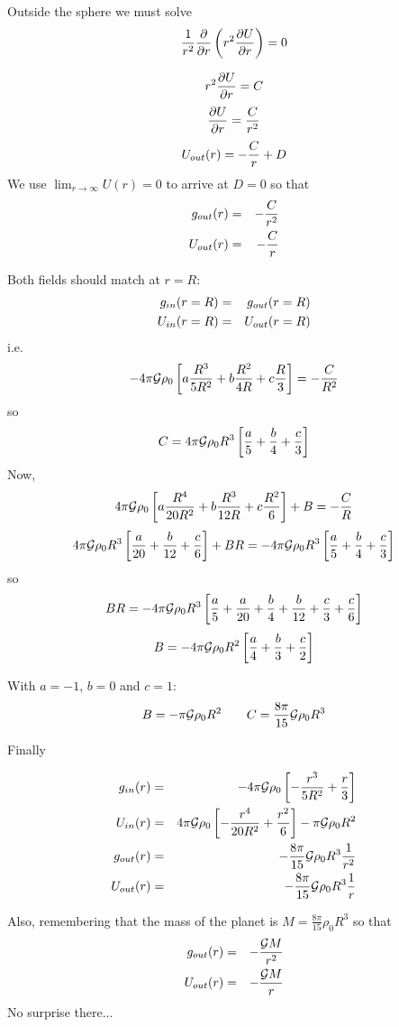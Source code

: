 Outside the sphere we must solve 
\begin{equation}
\frac{1}{r^2} \frac{\partial}{\partial r} \left( r^2 \frac{\partial U}{\partial r} \right) = 0 \nonumber
\end{equation}

\begin{equation}
r^2 \frac{\partial U}{\partial r}  = C \nonumber 
\end{equation}
\begin{equation}
\frac{\partial U}{\partial r}  = \frac{C}{r^2} \nonumber
\end{equation}
\begin{equation}
U_{out}(r) = -\frac{C}{r} + D  \nonumber
\end{equation}
We use $\lim_{r\rightarrow\infty}U(r)=0$ to arrive at $D=0$ so that 
\begin{eqnarray}
g_{out}(r) &=& -\frac{C}{r^2}  \nonumber\\
U_{out}(r) &=& -\frac{C}{r} \nonumber
\end{eqnarray}

Both fields should match at $r=R$:
\begin{eqnarray}
g_{in}(r=R) &=& g_{out}(r=R) \nonumber\\
U_{in}(r=R) &=& U_{out}(r=R) \nonumber
\end{eqnarray}
i.e.
\[
-4 \pi {\cal G} \rho_0 \left[ a \frac{R^3}{5R^2}+ b \frac{R^2}{4R} + c \frac{R}{3} \right]  =   -\frac{C}{R^2} 
\]
so 
\[
C = 4 \pi {\cal G} \rho_0 R^3 \left[ \frac{a}{5}+ \frac{b}{4} +  \frac{c}{3} \right]   
\]
Now, 
\[
4 \pi {\cal G} \rho_0 \left[ a \frac{R^4}{20R^2}+ b \frac{R^3}{12R} + c \frac{R^2}{6} \right] + B = -\frac{C}{R} 
\]
\[
4 \pi {\cal G} \rho_0 R^3 \left[  \frac{a}{20}+ \frac{b}{12} +  \frac{c}{6} \right] + B R = -4 \pi {\cal G} \rho_0 R^3 \left[  \frac{a}{5}+  \frac{b}{4} +  \frac{c}{3} \right]   
\]
so 
\[
B R= -4 \pi {\cal G} \rho_0 R^3 \left[
 \frac{a}{5}+ \frac{a}{20}
+\frac{b}{4}+ \frac{b}{12}
+\frac{c}{3}+ \frac{c}{6}
\right]
\]
\[
B = -4 \pi {\cal G} \rho_0 R^2 \left[
 \frac{a}{4}
+\frac{b}{3}
+\frac{c}{2}
\right]
\]

With $a=-1$, $b=0$ and $c=1$:
\[
B = - \pi {\cal G} \rho_0 R^2  
\qquad
C = \frac{8\pi}{15} {\cal G} \rho_0 R^3 
\]

Finally

\begin{eqnarray}
g_{in}(r) &=&  -4 \pi {\cal G} \rho_0 \left[ - \frac{r^3}{5R^2}+   \frac{r}{3} \right] \nonumber \\
U_{in}(r) &=& 4 \pi {\cal G} \rho_0 \left[ - \frac{r^4}{20R^2} +  \frac{r^2}{6} \right] 
 - \pi {\cal G} \rho_0 R^2  \nonumber\\
g_{out}(r) &=& - \frac{8\pi}{15} {\cal G} \rho_0 R^3 \frac{1}{r^2} \nonumber\\ 
U_{out}(r) &=& -\frac{8\pi}{15} {\cal G} \rho_0 R^3 \frac{1}{r}  \nonumber
\end{eqnarray}

Also, remembering that the mass of the planet is  $M=\frac{8 \pi}{15} \rho_0 R^3$
so that 
\begin{eqnarray}
g_{out}(r) &=& - \frac{ {\cal G} M}{r^2} \nonumber\\ 
U_{out}(r) &=& -  \frac{ {\cal G} M}{r} \nonumber 
\end{eqnarray}
No surprise there...



